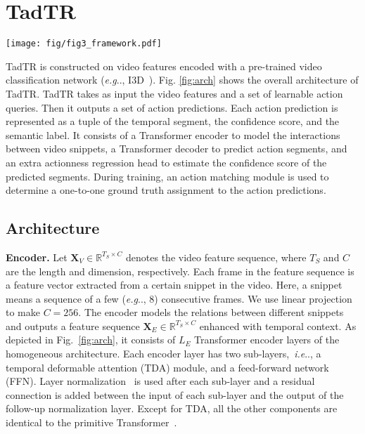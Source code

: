 \documentclass[lettersize,journal]{IEEEtran}
\makeatletter
\DeclareRobustCommand\onedot{\futurelet\@let@token\@onedot}
\def\@onedot{\ifx\@let@token.\else.\null\fi\xspace}
\def\eg{\emph{e.g}\onedot} \def\Eg{\emph{E.g}\onedot}
\def\ie{\emph{i.e}\onedot} \def\Ie{\emph{I.e}\onedot}
\def\R{\mathbb{R}}
\makeatother
\begin{document}
\section{TadTR}
\begin{figure*}
\centering
\texttt{[image: fig/fig3\_framework.pdf]}
\caption{The architecture of TadTR. It takes the video features extracted with a CNN and a set of learnable action queries as input and decodes a set of action predictions in parallel via a Transformer. The encoder captures the long-term context in the input feature sequence. The decoder extracts relevant context from the encoder for each action query and models the relations between action queries. Upon the decoder, we use feed-forward networks to predict the segments and classes of output actions. A segment refinement mechanism (the blue box) and an actionness regression head (the orange box) are utilized to refine the boundaries and the confidence scores of the predicted actions, respectively.}
\label{fig:arch}
\end{figure*}
TadTR is constructed on video features encoded with a pre-trained video classification network (\eg, I3D~\cite{carreira2017quo}).
Fig. \ref{fig:arch} shows the overall architecture of TadTR. TadTR takes as input the video features and a set of learnable action queries. Then it outputs a set of action predictions. Each action prediction is represented as a tuple of the temporal segment, the confidence score, and the semantic label. It consists of a Transformer encoder to model the interactions between video snippets, a Transformer decoder to predict action segments, and an extra actionness regression head to estimate the confidence score of the predicted segments. During training, an action matching module is used to determine a one-to-one ground truth assignment to the action predictions.

\subsection{Architecture}
\noindent\textbf{Encoder.}
Let $\boldsymbol{X}_V \in \R ^{T_S\times C}$ denotes the video feature sequence, where $T_S$ and $C$ are the length and dimension, respectively. Each frame in the feature sequence is a feature vector extracted from a certain snippet in the video. Here, a snippet means a sequence of a few (\eg, 8) consecutive frames. We use linear projection to make $C=256$.
The encoder models the relations between different snippets and outputs a feature sequence $\boldsymbol{X}_E \in \R^{T_S \times C}$ enhanced with temporal context. As depicted in Fig.~\ref{fig:arch}, it consists of $L_E$ Transformer encoder layers of the homogeneous architecture. Each encoder layer has two sub-layers,~\ie, a temporal deformable attention (TDA) module, and a feed-forward network (FFN). Layer normalization~\cite{ba2016layer} is used after each sub-layer and a residual connection is added between the input of each sub-layer and the output of the follow-up normalization layer. Except for TDA, all the other components are identical to the primitive Transformer~\cite{vaswani2017attention}. 
\end{document}
